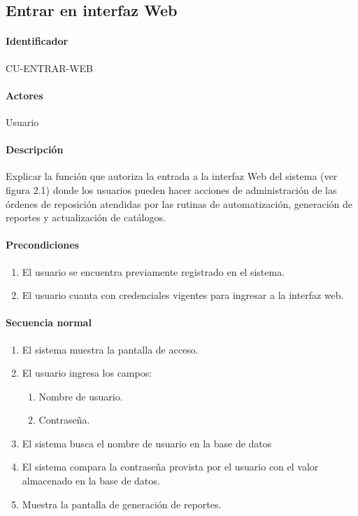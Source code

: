 \subsection{Entrar en interfaz Web}
\paragraph{Identificador}
CU-ENTRAR-WEB
\paragraph{Actores}
Usuario
\paragraph{Descripción}
Explicar la función que autoriza la entrada a la interfaz Web del sistema (ver figura 2.1) donde los usuarios pueden hacer acciones de administración de las órdenes de reposición atendidas por las rutinas de automatización, generación de reportes y actualización de catálogos.
\paragraph{Precondiciones}
\begin{enumerate}
  \item El usuario se encuentra previamente registrado en el sistema.
  \item El usuario cuanta con credenciales vigentes para ingresar a la interfaz web.
\end{enumerate}
\paragraph{Secuencia normal}
\begin{enumerate}
  \item El sistema muestra la pantalla de acceso.
  \item El usuario ingresa los campos:
  \begin{enumerate}
    \item Nombre de usuario.
    \item Contraseña.
  \end{enumerate}
  \item El sistema busca el nombre de usuario en la base de datos
  \item El sistema compara la contraseña provista por el usuario con el valor almacenado en la base de datos.
  \item Muestra la pantalla de generación de reportes.
\end{enumerate}
